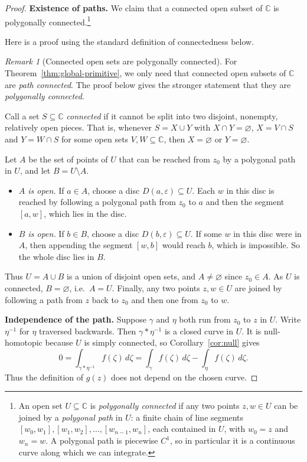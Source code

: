 \documentclass[11pt]{article}
\theoremstyle{plain}
\theoremstyle{definition}
\theoremstyle{remark}
\newtheorem*{remark}{Remark}
\numberwithin{equation}{section}
\newcommand{\C}{\mathbb{C}}
\begin{document}
\begin{proof}
\textbf{Existence of paths.} We claim that a connected open subset of $\C$ is
polygonally connected.\footnote{An open set $U\subseteq\C$ is
\emph{polygonally connected} if any two points $z,w\in U$ can be joined
by a \emph{polygonal path} in $U$: a finite chain of line segments
$[w_0,w_1],[w_1,w_2],\dots,[w_{n-1},w_n]$, each contained in $U$, with
$w_0=z$ and $w_n=w$. A polygonal path is piecewise $C^1$, so in
particular it is a continuous curve along which we can integrate.}

Here is a proof using the standard definition of connectedness below.

\begin{remark}[Connected open sets are polygonally connected]
For Theorem~\ref{thm:global-primitive}, we only need that connected open
subsets of $\C$ are \emph{path connected}. The proof below gives the
stronger statement that they are \emph{polygonally connected}.

Call a set $S\subseteq\C$ \emph{connected} if it cannot be split into
two disjoint, nonempty, relatively open pieces. That is, whenever
$S=X\cup Y$ with $X\cap Y=\varnothing$, $X=V\cap S$ and $Y=W\cap S$
for some open sets $V,W\subseteq\C$, then $X=\varnothing$ or
$Y=\varnothing$.

Let $A$ be the set of points of $U$ that can be reached from $z_0$ by a
polygonal path in $U$, and let $B=U\setminus A$.
\begin{itemize}
 \item \emph{$A$ is open.} If $a\in A$, choose a disc
 $D(a,\varepsilon)\subseteq U$. Each $w$ in this disc is reached by
 following a polygonal path from $z_0$ to $a$ and then the segment
 $[a,w]$, which lies in the disc.
 \item \emph{$B$ is open.} If $b\in B$, choose a disc
 $D(b,\varepsilon)\subseteq U$. If some $w$ in this disc were in $A$,
 then appending the segment $[w,b]$ would reach $b$, which is
 impossible. So the whole disc lies in $B$.
\end{itemize}
Thus $U=A\cup B$ is a union of disjoint open sets, and $A\ne\varnothing$
since $z_0\in A$. As $U$ is connected, $B=\varnothing$, i.e.\ $A=U$.
Finally, any two points $z,w\in U$ are joined by following a path from
$z$ back to $z_0$ and then one from $z_0$ to $w$.
\end{remark}

\textbf{Independence of the path.} Suppose $\gamma$ and $\eta$ both
run from $z_0$ to $z$ in $U$. Write $\eta^{-1}$ for $\eta$ traversed
backwards. Then $\gamma*\eta^{-1}$ is a closed curve in $U$.
It is null-homotopic because $U$ is simply connected, so
Corollary~\ref{cor:null} gives
\[
 0=\int_{\gamma*\eta^{-1}}f(\zeta)\,d\zeta
 =\int_\gamma f(\zeta)\,d\zeta-\int_\eta f(\zeta)\,d\zeta.
\]
Thus the definition of $g(z)$ does not depend on the chosen curve.


\end{proof}
\end{document}
